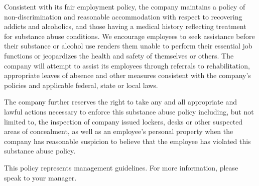 Consistent with its fair employment policy, the company maintains a policy of non-discrimination and reasonable accommodation with respect to recovering addicts and alcoholics, and those having a medical history reflecting treatment for substance abuse conditions. We encourage employees to seek assistance before their substance or alcohol use renders them unable to perform their essential job functions or jeopardizes the health and safety of themselves or others. The company will attempt to assist its employees through referrals to rehabilitation, appropriate leaves of absence and other measures consistent with the company's policies and applicable federal, state or local laws.

The company further reserves the right to take any and all appropriate and lawful actions necessary to enforce this substance abuse policy including, but not limited to, the inspection of company issued lockers, desks or other suspected areas of concealment, as well as an employee's personal property when the company has reasonable suspicion to believe that the employee has violated this substance abuse policy.

This policy represents management guidelines. For more information, please speak to your manager.